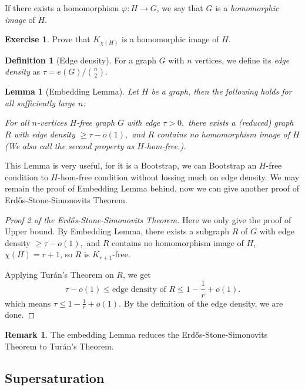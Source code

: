 \documentclass{article}
\newtheorem{lemma}[theorem]{Lemma}
\theoremstyle{definition}
\newtheorem{remark}[theorem]{Remark}
\newtheorem{definition}[theorem]{Definition}
\newtheorem{exercise}[theorem]{Exercise}
\def\Erdos{Erd\H{o}s}
\def\Turan{Tur\'an}
\begin{document}
If there exists a homomorphism $\varphi: H \rightarrow G$, we say that $G$ is a \emph{homomorphic image} of $H$.

\begin{exercise}
    Prove that $K_{\chi(H)}$ is a homomorphic image of $H$.
\end{exercise}

\begin{definition}[Edge density]
    For a graph $G$ with $n$ vertices, we define its \emph{edge density} as $\tau = e(G) / \binom{n}{2}$.
\end{definition}

\begin{lemma}[Embedding Lemma]
    Let $H$ be a graph, then the following holds for all sufficiently large $n$:

    For all $n$-vertices $H$-free graph $G$ with edge $\tau> 0,$ there exists a (reduced) graph $R$ with edge density $\geq \tau-o(1),$ and $R$ contains no homomorphism image of $H$(We also call the second property as $H$-hom-free.).
\end{lemma}

This Lemma is very useful, for it is a Bootstrap, we can Bootstrap an $H$-free condition to $H$-hom-free condition without lossing much on edge density. We may remain the proof of Embedding Lemma behind, now we can give another proof of \Erdos{}-Stone-Simonovits Theorem.


\begin{proof}[Proof 2 of the \Erdos{}-Stone-Simonovits Theorem]
    Here we only give the proof of Upper bound. By Embedding Lemma, there exists a subgraph $R$ of $G$ with edge density $\geq \tau-o(1),$ and $R$ contains no homomorphism image of $H$, $\chi(H)=r+1$, so $R$ is $K_{r+1}$-free. 

    Applying \Turan{}'s Theorem on $R$, we get
    \[\tau-o(1)\leq\text{edge density of $R$}\leq 1-\frac{1}{r}+o(1). \]
    which means $\tau\leq 1-\frac{1}{r}+o(1).$ By the definition of the edge density, we are done.
\end{proof}

\begin{remark}
    The embedding Lemma reduces the \Erdos{}-Stone-Simonovits Theorem to \Turan{}'s Theorem.
\end{remark}

\subsection{Supersaturation}
\end{document}
